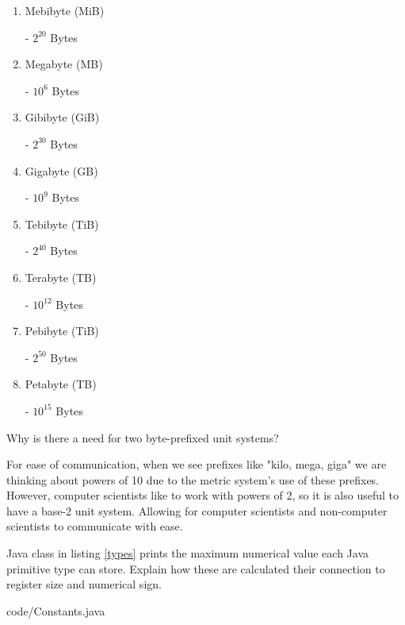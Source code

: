 \documentclass{homework}
\begin{document}
\begin{enumerate}
  \item Mebibyte (MiB)
    \begin{sol}
       - $2^{20}$ Bytes
    \end{sol}
  \item Megabyte (MB)
    \begin{sol}
       - $10^6$ Bytes
    \end{sol}
  \item Gibibyte (GiB)
    \begin{sol}
       - $2^{30}$ Bytes 
    \end{sol}
  \item Gigabyte (GB)
    \begin{sol}
       - $10^9$ Bytes
    \end{sol}
  \item Tebibyte (TiB)
    \begin{sol}
       - $2^{40}$ Bytes
    \end{sol}
  \item Terabyte (TB)
  \begin{sol}
     - $10^{12}$ Bytes
  \end{sol}
  \item Pebibyte (TiB)
  \begin{sol}
     - $2^{50}$ Bytes
  \end{sol}
  \item Petabyte (TB)
  \begin{sol}
     - $10^{15}$ Bytes
  \end{sol}
\end{enumerate}

Why is there a need for two byte-prefixed unit systems? \\
\begin{sol}
  For ease of communication, when we see prefixes like "kilo, mega, giga" we are thinking about powers of 10
  due to the metric system's use of these prefixes. However, computer scientists like to work with powers of 2,
  so it is also useful to have a base-2 unit system. Allowing for computer scientists and non-computer scientists to communicate with ease.
\end{sol}

\question Java class in listing \ref{types} prints the maximum numerical
value each Java primitive type can store. Explain how these are
calculated \ie their connection to register size and numerical
sign.


{code/Constants.java}
\end{document}
